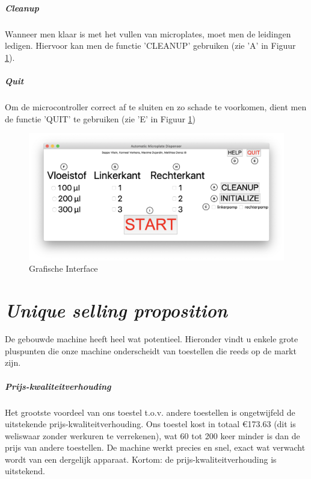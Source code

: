 \documentclass[a4paper,twoside,kulak]{kulakreport} %
\begin{document}
\paragraph{Cleanup}
Wanneer men klaar is met het vullen van microplates, moet men de leidingen ledigen. Hiervoor kan men de functie 'CLEANUP' gebruiken (zie 'A' in Figuur \ref{fig: Grafische interface}).
\paragraph{Quit}
Om de microcontroller correct af te sluiten en zo schade te voorkomen, dient men de functie 'QUIT' te gebruiken (zie 'E' in Figuur \ref{fig: Grafische interface})

\begin{figure}[h]

	\includegraphics[width=1.3\linewidth]{GI_letters.png}
	\caption{Grafische Interface}
	\label{fig: Grafische interface}
	
\end{figure} 


\chapter{\textit{Unique selling proposition}}

De gebouwde machine heeft heel wat potentieel. Hieronder vindt u enkele grote pluspunten die onze machine onderscheidt van toestellen die reeds op de markt zijn.

\paragraph{Prijs-kwaliteitverhouding}

Het grootste voordeel van ons toestel t.o.v. andere toestellen is ongetwijfeld de uitstekende prijs-kwaliteitverhouding. Ons toestel kost in totaal \euro 173.63 (dit is weliswaar zonder werkuren te verrekenen), wat 60 tot 200 keer minder is dan de prijs van andere toestellen. De machine werkt precies en snel, exact wat verwacht wordt van een dergelijk apparaat. Kortom: de prijs-kwaliteitverhouding is uitstekend.
\end{document}
